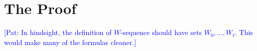 \documentclass{patmorin}
\newcommand{\pat}[1]{\textcolor{Blue}{[Pat: #1]}}
\DeclareMathOperator{\sep}{sn}
\DeclareMathOperator{\tw}{tw}
\begin{document}



\section{The Proof}

\pat{In hindsight, the definition of $W$-sequence should have sets $W_0,\ldots,W_{\ell}$.  This would make many of the formulas cleaner.}
\end{document}
